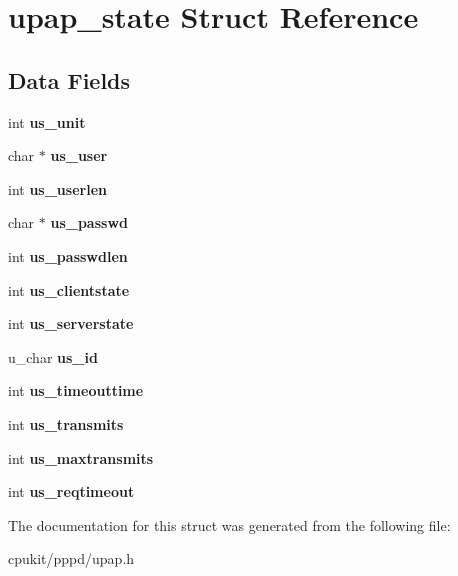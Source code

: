 \hypertarget{structupap__state}{}\section{upap\+\_\+state Struct Reference}
\label{structupap__state}
\subsection*{Data Fields}
\begin{DoxyCompactItemize}
\item 
\mbox{\label{structupap__state_adc585432fe14db07317291c2150e3a1b}} 
int {\bfseries us\+\_\+unit}
\item 
\mbox{\label{structupap__state_a5401f7b0161379c7711abbdd6a6cff26}} 
char $\ast$ {\bfseries us\+\_\+user}
\item 
\mbox{\label{structupap__state_a7342112e49f8a48040e37786c59c43ed}} 
int {\bfseries us\+\_\+userlen}
\item 
\mbox{\label{structupap__state_abd903741089e25a9b874f38fcabe7e5c}} 
char $\ast$ {\bfseries us\+\_\+passwd}
\item 
\mbox{\label{structupap__state_a04ccebf0820d0314b576cc5cf715ad08}} 
int {\bfseries us\+\_\+passwdlen}
\item 
\mbox{\label{structupap__state_a7ef2b5694915e54108a25e5c53097049}} 
int {\bfseries us\+\_\+clientstate}
\item 
\mbox{\label{structupap__state_abd377d0ef5162ecb730c8864c21321f0}} 
int {\bfseries us\+\_\+serverstate}
\item 
\mbox{\label{structupap__state_a96ceacd2cc483fdce6336699c58963ab}} 
u\+\_\+char {\bfseries us\+\_\+id}
\item 
\mbox{\label{structupap__state_a0ce4be8d394ed176a8af6a9f636eb5a7}} 
int {\bfseries us\+\_\+timeouttime}
\item 
\mbox{\label{structupap__state_accab340586e5ca1d66963492588e0003}} 
int {\bfseries us\+\_\+transmits}
\item 
\mbox{\label{structupap__state_a59a22b89969c879d94cd7e95fa17e2dd}} 
int {\bfseries us\+\_\+maxtransmits}
\item 
\mbox{\label{structupap__state_a88f204e351416d46580b461167a3b740}} 
int {\bfseries us\+\_\+reqtimeout}
\end{DoxyCompactItemize}


The documentation for this struct was generated from the following file\+:\begin{DoxyCompactItemize}
\item 
cpukit/pppd/upap.\+h\end{DoxyCompactItemize}
